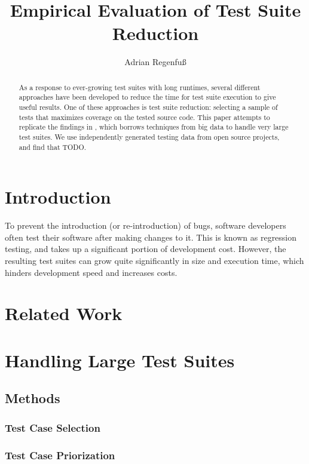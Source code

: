 \documentclass[a4paper,10pt]{article}
\title{Empirical Evaluation of Test Suite Reduction}
\author{Adrian Regenfuß}
\begin{document}
\maketitle

\tableofcontents
\newpage

\begin{abstract}
As a response to ever-growing test suites with long runtimes, several
different approaches have been developed to reduce the time for test
suite execution to give useful results. One of these approaches is test
suite reduction: selecting a sample of tests that maximizes coverage on
the tested source code. This paper attempts to replicate the findings
in \citealt{cruciani2019scalable}, which borrows techniques from big
data to handle very large test suites. We use independently generated
testing data from open source projects, and find that TODO.
\end{abstract}

\section{Introduction}

To prevent the introduction (or re-introduction) of bugs, software
developers often test their software after making changes to it.
This is known as regression testing, and takes up a significant portion
of development cost. However, the resulting test suites can grow quite
significantly in size and execution time, which hinders development
speed and increases costs.

\section{Related Work}

\section{Handling Large Test Suites}

\subsection{Methods}

\subsubsection{Test Case Selection}

\subsubsection{Test Case Priorization}
\end{document}
